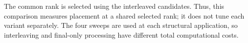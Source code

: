 
The common rank is selected using the interleaved candidates. Thus, this
comparison measures placement at a shared selected rank; it does not tune
each variant separately. The four sweeps are used at each structural
application, so interleaving and final-only processing have different
total computational costs.
